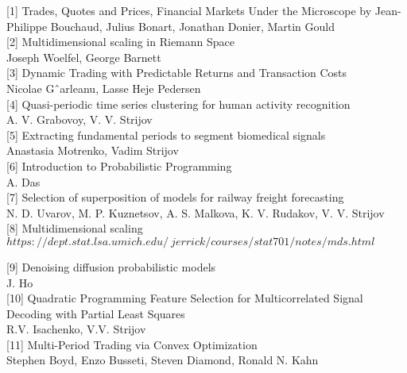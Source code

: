 \documentclass{article}
\begin{document}





[1] Trades, Quotes and Prices, Financial Markets Under the Microscope by Jean-Philippe Bouchaud, Julius Bonart, Jonathan Donier, Martin Gould\\

[2] Multidimensional scaling in Riemann Space\\
Joseph Woelfel, George Barnett\\

[3] Dynamic Trading with Predictable Returns and Transaction Costs\\
Nicolae Gˆarleanu, Lasse Heje Pedersen\\

[4] Quasi-periodic time series clustering for human activity recognition\\
A. V. Grabovoy, V. V. Strijov\\

[5] Extracting fundamental periods to segment biomedical signals\\
Anastasia Motrenko, Vadim Strijov\\

[6] Introduction to Probabilistic Programming\\
A. Das\\

[7] Selection of superposition of models for railway freight forecasting\\
N. D. Uvarov, M. P. Kuznetsov, A. S. Malkova, K. V. Rudakov, V. V. Strijov\\

[8] Multidimensional scaling\\
$https://dept.stat.lsa.umich.edu/~jerrick/courses/stat701/notes/mds.html$

[9] Denoising diffusion probabilistic models\\
J. Ho\\

[10] Quadratic Programming Feature Selection for Multicorrelated Signal Decoding with Partial Least Squares\\
R.V. Isachenko, V.V. Strijov\\

[11] Multi-Period Trading via Convex Optimization\\
Stephen Boyd, Enzo Busseti, Steven Diamond, Ronald N. Kahn
\end{document}
